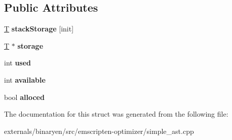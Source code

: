 \subsection*{Public Attributes}
\begin{DoxyCompactItemize}
\item 
\mbox{\label{structcashew_1_1_stacked_stack_a5496dc432c36142e1ce6ce754475dc1c}} 
\mbox{\hyperlink{struct_t}{T}} {\bfseries stack\+Storage} \mbox{[}init\mbox{]}
\item 
\mbox{\label{structcashew_1_1_stacked_stack_a9833504f9cbcd02e29eada7ad7663352}} 
\mbox{\hyperlink{struct_t}{T}} $\ast$ {\bfseries storage}
\item 
\mbox{\label{structcashew_1_1_stacked_stack_aacbcc5911cab7c3b5b5f67cde659a3db}} 
int {\bfseries used}
\item 
\mbox{\label{structcashew_1_1_stacked_stack_a9bd848d09f9d97de1cae272b8fcec951}} 
int {\bfseries available}
\item 
\mbox{\label{structcashew_1_1_stacked_stack_a2ebb4d4d2a009d42f83fc862c42172fd}} 
bool {\bfseries alloced}
\end{DoxyCompactItemize}


The documentation for this struct was generated from the following file\+:\begin{DoxyCompactItemize}
\item 
externals/binaryen/src/emscripten-\/optimizer/simple\+\_\+ast.\+cpp\end{DoxyCompactItemize}
